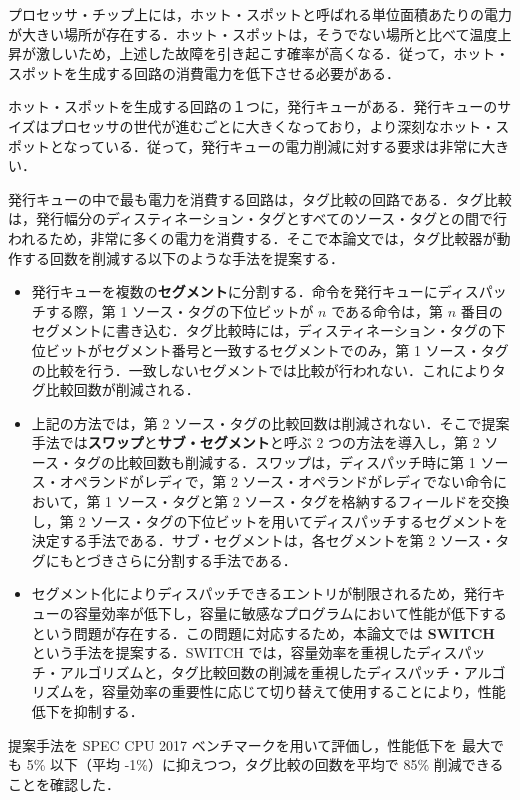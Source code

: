\documentclass[submit,techrep,noauthor]{ipsj}
\begin{document}
プロセッサ・チップ上には，ホット・スポットと呼ばれる単位面積あたりの電力が大きい場所が存在する．ホット・スポットは，そうでない場所と比べて温度上昇が激しいため，上述した故障を引き起こす確率が高くなる．従って，ホット・スポットを生成する回路の消費電力を低下させる必要がある．

ホット・スポットを生成する回路の１つに，発行キューがある．発行キューのサイズはプロセッサの世代が進むごとに大きくなっており，より深刻なホット・スポットとなっている．従って，発行キューの電力削減に対する要求は非常に大きい．
  
発行キューの中で最も電力を消費する回路は，タグ比較の回路である．タグ比較は，発行幅分のディスティネーション・タグとすべてのソース・タグとの間で行われるため，非常に多くの電力を消費する．そこで本論文では，タグ比較器が動作する回数を削減する以下のような手法を提案する．
\begin{itemize}
  \item 発行キューを複数の\textbf{セグメント}に分割する．命令を発行キューにディスパッチする際，第 1 ソース・タグの下位ビットが $n$ である命令は，第 $n$ 番目のセグメントに書き込む．タグ比較時には，ディスティネーション・タグの下位ビットがセグメント番号と一致するセグメントでのみ，第 1 ソース・タグの比較を行う．一致しないセグメントでは比較が行われない．これによりタグ比較回数が削減される．
  \item 上記の方法では，第 2 ソース・タグの比較回数は削減されない．そこで提案手法では\textbf{スワップ}と\textbf{サブ・セグメント}と呼ぶ 2 つの方法を導入し，第 2 ソース・タグの比較回数も削減する．スワップは，ディスパッチ時に第 1 ソース・オペランドがレディで，第 2 ソース・オペランドがレディでない命令において，第 1 ソース・タグと第 2  ソース・タグを格納するフィールドを交換し，第 2 ソース・タグの下位ビットを用いてディスパッチするセグメントを決定する手法である．サブ・セグメントは，各セグメントを第 2 ソース・タグにもとづきさらに分割する手法である．
  \item セグメント化によりディスパッチできるエントリが制限されるため，発行キューの容量効率が低下し，容量に敏感なプログラムにおいて性能が低下するという問題が存在する．この問題に対応するため，本論文では \textbf{SWITCH} という手法を提案する．SWITCH では，容量効率を重視したディスパッチ・アルゴリズムと，タグ比較回数の削減を重視したディスパッチ・アルゴリズムを，容量効率の重要性に応じて切り替えて使用することにより，性能低下を抑制する．
\end{itemize}

提案手法を SPEC CPU 2017 ベンチマークを用いて評価し，性能低下を 最大でも 5\% 以下（平均 -1\%）に抑えつつ，タグ比較の回数を平均で 85\% 削減できることを確認した．
\end{document}

